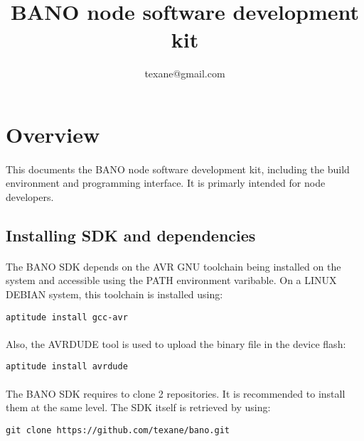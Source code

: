 \documentclass[a4paper, 11pt]{article}
\begin{document}
\title{BANO node software development kit}
\author{texane@gmail.com}
\date{}

\maketitle



\clearpage
\section{Overview}

\paragraph{}
This documents the BANO node software development kit, including
the build environment and programming interface. It is primarly
intended for node developers.

\subsection{Installing SDK and dependencies}

\paragraph{}
The BANO SDK depends on the AVR GNU toolchain being installed on
the system and accessible using the PATH environment varibable.
On a LINUX DEBIAN system, this toolchain is installed using:
\begin{scriptsize}
\begin{verbatim}
aptitude install gcc-avr
\end{verbatim}
\end{scriptsize}

\paragraph{}
Also, the AVRDUDE tool is used to upload the binary file in the
device flash:
\begin{scriptsize}
\begin{verbatim}
aptitude install avrdude
\end{verbatim}
\end{scriptsize}

\paragraph{}
The BANO SDK requires to clone 2 repositories. It is recommended
to install them at the same level. The SDK itself is retrieved by
using:
\begin{scriptsize}
\begin{verbatim}
git clone https://github.com/texane/bano.git
\end{verbatim}
\end{scriptsize}
\end{document}
